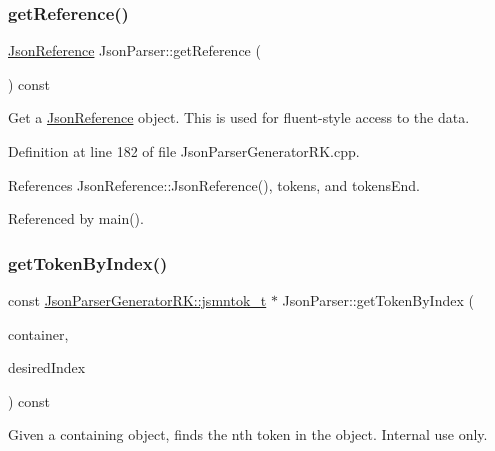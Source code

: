 \mbox{\label{class_json_parser_a27f639337cff7b364edb05c01f098786}} 
\subsubsection{\texorpdfstring{get\+Reference()}{getReference()}}
{\footnotesize\ttfamily \hyperlink{class_json_reference}{Json\+Reference} Json\+Parser\+::get\+Reference (\begin{DoxyParamCaption}{ }\end{DoxyParamCaption}) const}



Get a \hyperlink{class_json_reference}{Json\+Reference} object. This is used for fluent-\/style access to the data. 



Definition at line 182 of file Json\+Parser\+Generator\+R\+K.\+cpp.



References Json\+Reference\+::\+Json\+Reference(), tokens, and tokens\+End.



Referenced by main().

\mbox{\label{class_json_parser_a588d9c4fcfe9179db67ca42f5ba5229d}} 
\subsubsection{\texorpdfstring{get\+Token\+By\+Index()}{getTokenByIndex()}}
{\footnotesize\ttfamily const \hyperlink{struct_json_parser_generator_r_k_1_1jsmntok__t}{Json\+Parser\+Generator\+R\+K\+::jsmntok\+\_\+t} $\ast$ Json\+Parser\+::get\+Token\+By\+Index (\begin{DoxyParamCaption}\item[{const \hyperlink{struct_json_parser_generator_r_k_1_1jsmntok__t}{Json\+Parser\+Generator\+R\+K\+::jsmntok\+\_\+t} $\ast$}]{container,  }\item[{size\+\_\+t}]{desired\+Index }\end{DoxyParamCaption}) const}



Given a containing object, finds the nth token in the object. Internal use only. 


